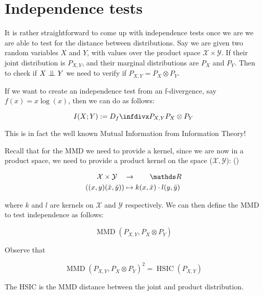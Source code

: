 
\section{Independence tests}

It is rather straightforward to come up with independence tests once we are we are able to test 
for the distance between distributions. Say we are given two random variables $X$ and $Y$, with 
values over the product space $\mathcal{X} \times \mathcal{Y}$. If their joint distribution is 
$P_{X, Y}$, and their marginal distributions are $P_X$ and $P_Y$. Then to check if $X \bigCI Y$
we need to verify if $P_{X, Y} = P_X \otimes P_Y$.

If we want to create an independence test from an f-divergence, say $f(x) = x\log(x)$, then we 
can do as follows:

$$
    I (X; Y) :=  \infdiv{P_{X, Y}}{P_X \otimes P_Y}
$$

This is in fact the well known Mutual Information from Information Theory! 

Recall that for the MMD we need to provide a kernel, since we are now in a product space, we need 
to provide a product kernel on the space ($\mathcal{X}, \mathcal{Y}$): (\cite{Peters2008diploma})

\begin{align*}
    \mathcal{X} \times \mathcal{Y} \quad &\rightarrow \qquad \R \\
    ( (x, y) (\tilde{x}, \tilde{y})) &\mapsto k(x, \tilde{x}) \cdot l(y, \tilde{y})
\end{align*}

where $k$ and $l$ are kernels on $\mathcal{X}$ and $\mathcal{Y}$ respectively. We can then define the 
MMD to test independence as follows:

$$
    \operatorname{MMD}\left( P_{X, Y}, P_X \otimes P_Y  \right)
$$

Observe that 

$$
    \operatorname{MMD}\left( P_{X, Y}, P_X \otimes P_Y  \right)^2 = \operatorname{HSIC}(P_{X, Y})
$$

The HSIC is the MMD distance between the joint and product distribution. 


